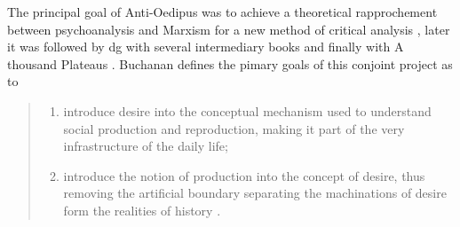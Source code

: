 %
%
%


The principal goal of Anti-Oedipus \cite*{deleuze1983} was to achieve a theoretical rapprochement between psychoanalysis and Marxism for a new method of critical analysis \parencite[39]{buchanan2008b}, later it was followed by \gls{dg} with several intermediary books and finally with A thousand Plateaus \cite*{deleuze1987}. Buchanan \parencite*{buchanan2008b} defines the pimary goals of this conjoint project as to
\begin{quote}
	\begin{enumerate}
		\item introduce desire into the conceptual mechanism used to understand social production and reproduction, making it part of the very infrastructure of the daily life;
		\item introduce the notion of production into the concept  of desire,  thus removing the artificial boundary separating the machinations of desire form the realities of history \cite[39-42]{buchanan2008b}.
	\end{enumerate}
\end{quote}

